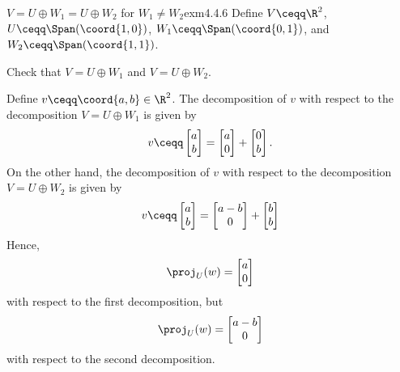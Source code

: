 \begin{exm}{$V=U\oplus W_1=U\oplus W_2$ for $W_1\neq W_2$}{exm4.4.6}
	Define $V\ceqq \R ^2$, $U\ceqq \Span (\coord{1,0})$, $W_1\ceqq \Span (\coord{0,1})$, and $W_2\ceqq \Span (\coord{1,1})$.
	\begin{exr}[breakable=false]{}{}
		Check that $V=U\oplus W_1$ and $V=U\oplus W_2$.
	\end{exr}

	Define $v\ceqq \coord{a,b}\in \R ^2$.  The decomposition of $v$ with respect to the decomposition $V=U\oplus W_1$ is given by
	\begin{equation}
		v\ceqq \begin{bmatrix}a \\ b\end{bmatrix}=\begin{bmatrix}a \\ 0\end{bmatrix}+\begin{bmatrix}0 \\ b\end{bmatrix}.
	\end{equation}
	On the other hand, the decomposition of $v$ with respect to the decomposition $V=U\oplus W_2$ is given by
	\begin{equation}
		v\ceqq \begin{bmatrix}a \\ b\end{bmatrix}=\begin{bmatrix}a-b \\ 0\end{bmatrix}+\begin{bmatrix}b \\ b\end{bmatrix}
	\end{equation}
	Hence,
	\begin{equation}
		\proj _U(w)=\begin{bmatrix}a \\ 0\end{bmatrix}
	\end{equation}
	with respect to the first decomposition, but
	\begin{equation}
		\proj _U(w)=\begin{bmatrix}a-b \\ 0\end{bmatrix}
	\end{equation}
	with respect to the second decomposition.
\end{exm}

